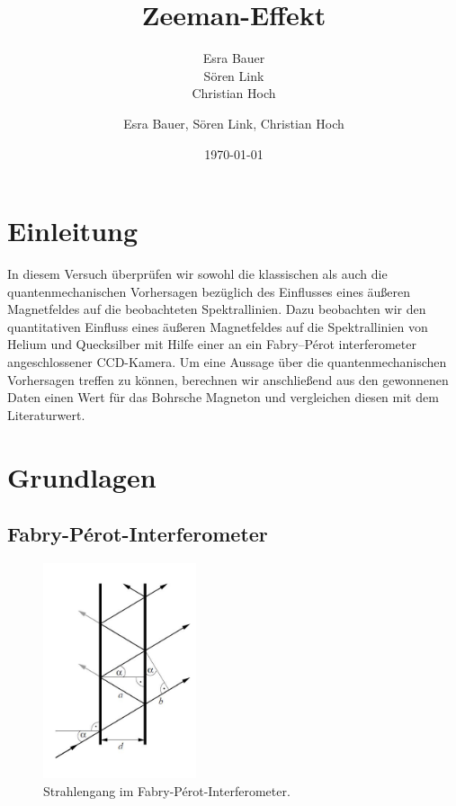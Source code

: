 \documentclass[bigchapter,colorback,accentcolor=tud4b,linedtoc,11pt]{tudreport}
\title{Zeeman-Effekt}
\subtitle{Esra Bauer  \\Sören Link \\Christian Hoch}
\author{Esra Bauer, Sören Link, Christian Hoch}
\date{\today}
\begin{document}

\maketitle

\tableofcontents

\chapter{Einleitung}
In diesem Versuch überprüfen wir sowohl die klassischen als auch die
quantenmechanischen Vorhersagen bezüglich des Einflusses eines äußeren
Magnetfeldes auf die beobachteten Spektrallinien. Dazu beobachten wir den
quantitativen Einfluss eines äußeren Magnetfeldes auf die Spektrallinien von
Helium und Quecksilber mit Hilfe einer an ein Fabry–Pérot interferometer
angeschlossener CCD-Kamera. Um eine Aussage über die quantenmechanischen
Vorhersagen treffen zu können, berechnen wir anschließend aus den gewonnenen
Daten einen Wert für das Bohrsche Magneton und vergleichen diesen mit dem
Literaturwert.

\chapter{Grundlagen}


\section{Fabry-Pérot-Interferometer}

\begin{figure}[H] 
  \centering
     \includegraphics[width=0.4\textwidth]{data/Fabry.jpg}
  \caption{Strahlengang im Fabry-Pérot-Interferometer.}
  \label{fig:Bild1}
\end{figure}
\end{document}
